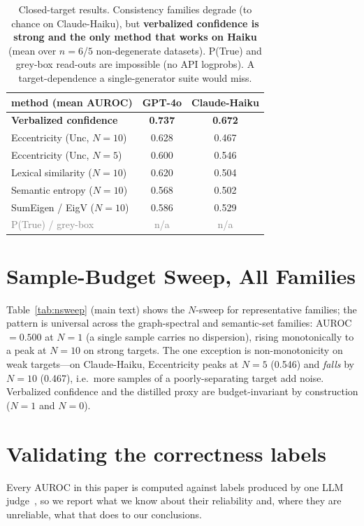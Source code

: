 \documentclass[11pt]{article}
\newcommand{\best}[1]{\textbf{#1}}
\newcommand{\grey}[1]{\textcolor{gray}{#1}}
\begin{document}
\begin{table}[t]\centering\small
\setlength{\tabcolsep}{5pt}
\begin{tabular}{l cc}
\toprule
method (mean AUROC) & GPT-4o & Claude-Haiku\\
\midrule
\textbf{Verbalized confidence} & \best{0.737} & \best{0.672}\\
Eccentricity (Unc, $N{=}10$)  & 0.628 & 0.467\\
Eccentricity (Unc, $N{=}5$)   & 0.600 & 0.546\\
Lexical similarity ($N{=}10$) & 0.620 & 0.504\\
Semantic entropy ($N{=}10$)   & 0.568 & 0.502\\
SumEigen / EigV ($N{=}10$)    & 0.586 & 0.529\\
\midrule
\grey{P(True) / grey-box}     & \grey{n/a} & \grey{n/a}\\
\bottomrule
\end{tabular}
\caption{Closed-target results. Consistency families degrade (to chance on Claude-Haiku),
but \textbf{verbalized confidence is strong and the only method that works on Haiku}
(mean over $n{=}6$/$5$ non-degenerate datasets). P(True) and grey-box read-outs are
impossible (no API logprobs). A target-dependence a single-generator suite would miss.}
\label{tab:app-closed}
\end{table}

\section{Sample-Budget Sweep, All Families}\label{app:nsweep}
Table~\ref{tab:nsweep} (main text) shows the $N$-sweep for representative families; the
pattern is universal across the graph-spectral and semantic-set families: AUROC $=0.500$
at $N{=}1$ (a single sample carries no dispersion), rising monotonically to a peak at
$N{=}10$ on strong targets. The one exception is non-monotonicity on weak targets---on
Claude-Haiku, Eccentricity peaks at $N{=}5$ (0.546) and \emph{falls} by $N{=}10$
(0.467), i.e.\ more samples of a poorly-separating target add noise. Verbalized confidence
and the distilled proxy are budget-invariant by construction ($N{=}1$ and $N{=}0$).

\section{Validating the correctness labels}\label{sec:judge}
Every AUROC in this paper is computed against labels produced by one LLM
judge~\citep{zheng2023judge}, so we report what we know about their reliability and, where they
are unreliable, what that does to our conclusions.
\end{document}
